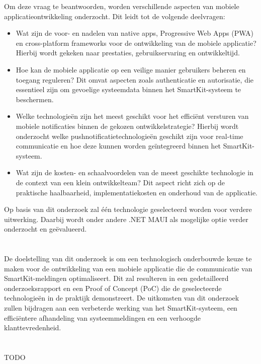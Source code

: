 \noindent Om deze vraag te beantwoorden, worden verschillende aspecten van mobiele applicatieontwikkeling onderzocht. Dit leidt tot de volgende deelvragen:

\begin{itemize}
    \item Wat zijn de voor- en nadelen van native apps, Progressive Web Apps (PWA) en cross-platform frameworks voor de ontwikkeling van de mobiele applicatie? Hierbij wordt gekeken naar prestaties, gebruikservaring en ontwikkeltijd.
    
    \item Hoe kan de mobiele applicatie op een veilige manier gebruikers beheren en toegang reguleren? Dit omvat aspecten zoals authenticatie en autorisatie, die essentieel zijn om gevoelige systeemdata binnen het SmartKit-systeem te beschermen.
    
    \item Welke technologieën zijn het meest geschikt voor het efficiënt versturen van mobiele notificaties binnen de gekozen ontwikkelstrategie? Hierbij wordt onderzocht welke pushnotificatietechnologieën geschikt zijn voor real-time communicatie en hoe deze kunnen worden geïntegreerd binnen het SmartKit-systeem.
    
    \item Wat zijn de kosten- en schaalvoordelen van de meest geschikte technologie in de context van een klein ontwikkelteam? Dit aspect richt zich op de praktische haalbaarheid, implementatiekosten en onderhoud van de applicatie.
\end{itemize}

\noindent Op basis van dit onderzoek zal één technologie geselecteerd worden voor verdere uitwerking. Daarbij wordt onder andere .NET MAUI als mogelijke optie verder onderzocht en geëvalueerd.


\section{}%
\label{sec:onderzoeksdoelstelling}

\noindent De doelstelling van dit onderzoek is om een technologisch onderbouwde keuze te maken voor de ontwikkeling van een mobiele applicatie die de communicatie van SmartKit-meldingen optimaliseert. Dit zal resulteren in een gedetailleerd onderzoeksrapport en een Proof of Concept (PoC) die de geselecteerde technologieën in de praktijk demonstreert. De uitkomsten van dit onderzoek zullen bijdragen aan een verbeterde werking van het SmartKit-systeem, een efficiëntere afhandeling van systeemmeldingen en een verhoogde klanttevredenheid. \\

\section{}%
\label{sec:opzet-bachelorproef}

TODO


